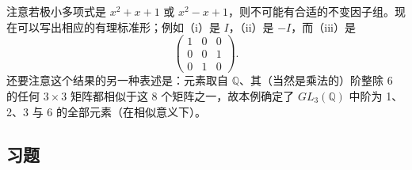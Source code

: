 \begin{example}
注意若极小多项式是 \(x^2+x+1\) 或 \(x^2-x+1\)，则不可能有合适的不变因子组。现在可以写出相应的有理标准形；例如（i）是 \(I\)，（ii）是 \(-I\)，而（iii）是
\[
\begin{pmatrix} 1 & 0 & 0 \\ 0 & 0 & 1 \\ 0 & 1 & 0 \end{pmatrix}.
\]
还要注意这个结果的另一种表述是：元素取自 \(\mathbb{Q}\)、其（当然是乘法的）阶整除 6 的任何 \(3 \times 3\) 矩阵都相似于这 8 个矩阵之一，故本例确定了 \(GL_3(\mathbb{Q})\) 中阶为 1、2、3 与 6 的全部元素（在相似意义下）。
\end{example}

\subsection*{习题}

